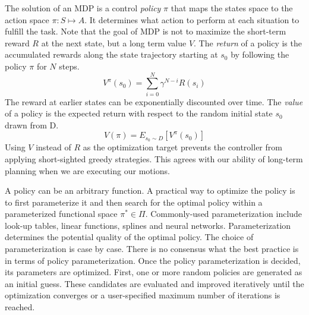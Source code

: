 The solution of an MDP is a control \emph{policy} $\pi$ that maps the states space to the action space $\pi: S\mapsto A$. It determines what action to perform at each situation to fulfill the task. Note that the goal of MDP is not to maximize the short-term reward $R$ at the next state, but a long term value $V$. The \emph{return} of a policy is the accumulated rewards along the state trajectory starting at $s_0$ by following the policy $\pi$ for $N$ steps.
\begin{displaymath}
V^\pi(s_0)=\sum_{i=0}^N{\gamma^{N-i}R(s_i)}
\end{displaymath}
The reward at earlier states can be exponentially discounted over time. The \emph{value} of a policy is the expected return with respect to the random initial state $s_0$ drawn from D.
\begin{equation}
V(\pi)=E_{s_0\sim D}[V^\pi(s_0)]
\label{eq:policyValue}
\end{equation}
Using $V$ instead of $R$ as the optimization target prevents the controller from applying short-sighted greedy strategies. This agrees with our ability of long-term planning when we are executing our motions.

A policy can be an arbitrary function. A practical way to optimize the policy is to first parameterize it and then search for the optimal policy within a parameterized functional space $\pi^*\in\Pi$. Commonly-used parameterization include look-up tables, linear functions, splines and neural networks. Parameterization determines the potential quality of the optimal policy. The choice of parameterization is case by case. There is no consensus what the best practice is in terms of policy parameterization. Once the policy parameterization is decided, its parameters are optimized. First, one or more random policies are generated as an initial guess. These candidates are evaluated and improved iteratively until the optimization converges or a user-specified maximum number of iterations is reached.


